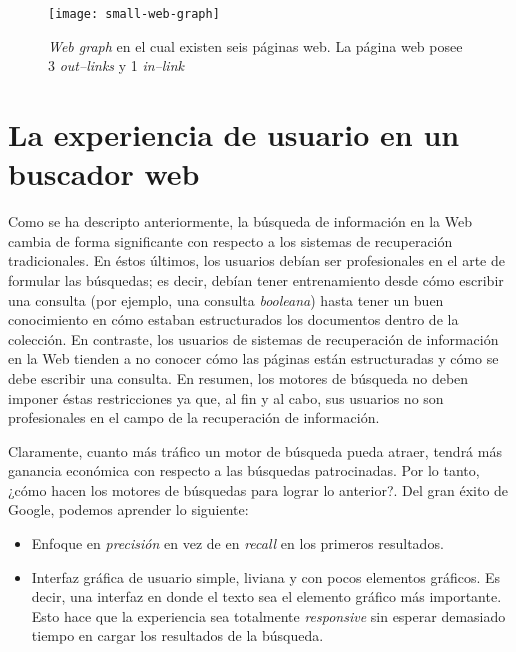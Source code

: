 	\begin{figure}[h]
		\texttt{[image: small-web-graph]}
		\centering
		\caption{\textit{Web graph} en el cual existen seis páginas web. La página web posee 3 \textit{out--links} y 1 \textit{in--link}}
	\end{figure}
	
\section{La experiencia de usuario en un buscador web}
	Como se ha descripto anteriormente, la búsqueda de información en la Web cambia de forma significante con respecto a los sistemas de recuperación tradicionales. En éstos últimos, los usuarios debían ser profesionales en el arte de formular las búsquedas; es decir, debían tener entrenamiento desde cómo escribir una consulta (por ejemplo, una consulta \textit{booleana}) hasta tener un buen conocimiento en cómo estaban estructurados los documentos dentro de la colección. En contraste, los usuarios de sistemas de recuperación de información en la Web tienden a no conocer cómo las páginas están estructuradas y cómo se debe escribir una consulta. En resumen, los motores de búsqueda no deben imponer éstas restricciones ya que, al fin y al cabo, sus usuarios no son profesionales en el campo de la recuperación de información. \par
	
	Claramente, cuanto más tráfico un motor de búsqueda pueda atraer, tendrá más ganancia económica con respecto a las búsquedas patrocinadas. Por lo tanto, ¿cómo hacen los motores de búsquedas para lograr lo anterior?. Del gran éxito de Google, podemos aprender lo siguiente:
	\begin{itemize}
		\item Enfoque en \textit{precisión} en vez de en \textit{recall} en los primeros resultados.
		\item Interfaz gráfica de usuario simple, liviana y con pocos elementos gráficos. Es decir, una interfaz en donde el texto sea el elemento gráfico más importante. Esto hace que la experiencia sea totalmente \textit{responsive} sin esperar demasiado tiempo en cargar los resultados de la búsqueda.
	\end{itemize}
	
